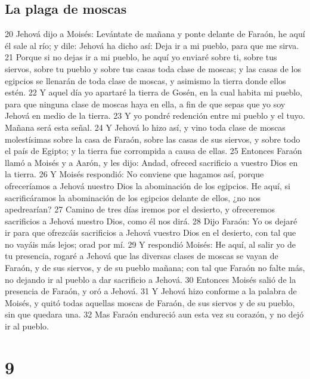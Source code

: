 \section*{La plaga de moscas}
20 Jehová dijo a Moisés: Levántate de mañana y ponte delante de Faraón, he aquí él sale al río; y dile: Jehová ha dicho así: Deja ir a mi pueblo, para que me sirva.
21 Porque si no dejas ir a mi pueblo, he aquí yo enviaré sobre ti, sobre tus siervos, sobre tu pueblo y sobre tus casas toda clase de moscas; y las casas de los egipcios se llenarán de toda clase de moscas, y asimismo la tierra donde ellos estén.
22 Y aquel día yo apartaré la tierra de Gosén, en la cual habita mi pueblo, para que ninguna clase de moscas haya en ella, a fin de que sepas que yo soy Jehová en medio de la tierra.
23 Y yo pondré redención entre mi pueblo y el tuyo. Mañana será esta señal.
24 Y Jehová lo hizo así, y vino toda clase de moscas molestísimas sobre la casa de Faraón, sobre las casas de sus siervos, y sobre todo el país de Egipto; y la tierra fue corrompida a causa de ellas.
25 Entonces Faraón llamó a Moisés y a Aarón, y les dijo: Andad, ofreced sacrificio a vuestro Dios en la tierra.
26 Y Moisés respondió: No conviene que hagamos así, porque ofreceríamos a Jehová nuestro Dios la abominación de los egipcios. He aquí, si sacrificáramos la abominación de los egipcios delante de ellos, ¿no nos apedrearían?
27 Camino de tres días iremos por el desierto, y ofreceremos sacrificios a Jehová nuestro Dios, como él nos dirá.
28 Dijo Faraón: Yo os dejaré ir para que ofrezcáis sacrificios a Jehová vuestro Dios en el desierto, con tal que no vayáis más lejos; orad por mí.
29 Y respondió Moisés: He aquí, al salir yo de tu presencia, rogaré a Jehová que las diversas clases de moscas se vayan de Faraón, y de sus siervos, y de su pueblo mañana; con tal que Faraón no falte más, no dejando ir al pueblo a dar sacrificio a Jehová.
30 Entonces Moisés salió de la presencia de Faraón, y oró a Jehová.
31 Y Jehová hizo conforme a la palabra de Moisés, y quitó todas aquellas moscas de Faraón, de sus siervos y de su pueblo, sin que quedara una.
32 Mas Faraón endureció aun esta vez su corazón, y no dejó ir al pueblo.

\chapter{9}

